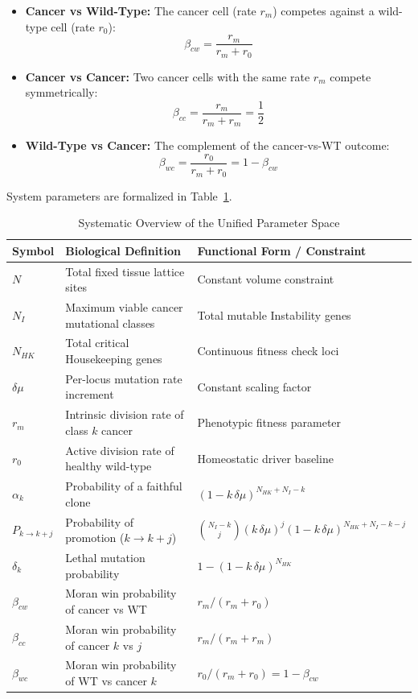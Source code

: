 \documentclass[11pt,a4paper]{article}
\begin{document}
\begin{itemize}
    \item \textbf{Cancer vs Wild-Type:} The cancer cell (rate $r_m$) competes against a wild-type cell (rate $r_0$):
    \begin{equation}
        \beta_{cw} = \frac{r_m}{r_m + r_0}
    \end{equation}
    \item \textbf{Cancer vs Cancer:} Two cancer cells with the same rate $r_m$ compete symmetrically:
    \begin{equation}
        \beta_{cc} = \frac{r_m}{r_m + r_m} = \frac{1}{2}
    \end{equation}
    \item \textbf{Wild-Type vs Cancer:} The complement of the cancer-vs-WT outcome:
    \begin{equation}
        \beta_{wc} = \frac{r_0}{r_m + r_0} = 1 - \beta_{cw}
    \end{equation}
\end{itemize}

System parameters are formalized in Table~\ref{tab:parameters}.

\begin{table}[htbp]
\centering
\caption{Systematic Overview of the Unified Parameter Space}
\label{tab:parameters}
\begin{tabular}{lll}
\toprule
\textbf{Symbol} & \textbf{Biological Definition} & \textbf{Functional Form / Constraint} \\
\midrule
$N$ & Total fixed tissue lattice sites & Constant volume constraint \\
$N_I$ & Maximum viable cancer mutational classes & Total mutable Instability genes \\
$N_{HK}$ & Total critical Housekeeping genes & Continuous fitness check loci \\
$\delta\mu$ & Per-locus mutation rate increment & Constant scaling factor \\
$r_m$ & Intrinsic division rate of class $k$ cancer & Phenotypic fitness parameter \\
$r_0$ & Active division rate of healthy wild-type & Homeostatic driver baseline \\
$\alpha_k$ & Probability of a faithful clone & $(1-k\,\delta\mu)^{N_{HK} + N_I - k}$ \\
$P_{k \to k+j}$ & Probability of promotion ($k \to k+j$) & $\binom{N_I-k}{j}(k\,\delta\mu)^j(1-k\,\delta\mu)^{N_{HK}+N_I-k-j}$ \\
$\delta_k$ & Lethal mutation probability & $1 - (1-k\,\delta\mu)^{N_{HK}}$ \\
$\beta_{cw}$ & Moran win probability of cancer vs WT & $r_m / (r_m + r_0)$ \\
$\beta_{cc}$ & Moran win probability of cancer $k$ vs $j$ & $r_m / (r_m + r_m)$ \\
$\beta_{wc}$ & Moran win probability of WT vs cancer $k$ & $r_0 / (r_m + r_0) = 1 - \beta_{cw}$ \\
\bottomrule
\end{tabular}
\end{table}
\end{document}
